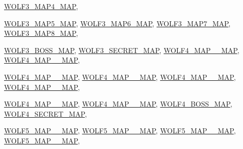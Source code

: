 \begin{DoxyCompactItemize}
\hyperlink{MAPSWL6_8H_a1949852ef0462081a2b248dd4918bb86a90ebcb09ab1567937fd158f38ebd1c60}{WOLF3\_\-MAP4\_\-MAP}, 
\par
\hyperlink{MAPSWL6_8H_a1949852ef0462081a2b248dd4918bb86a80a97ef076ec587cbfe05e7673778499}{WOLF3\_\-MAP5\_\-MAP}, 
\hyperlink{MAPSWL6_8H_a1949852ef0462081a2b248dd4918bb86a7103424829314ef6780f7b984b591d1a}{WOLF3\_\-MAP6\_\-MAP}, 
\hyperlink{MAPSWL6_8H_a1949852ef0462081a2b248dd4918bb86a9809951987be0669e3a1b05b26f031e4}{WOLF3\_\-MAP7\_\-MAP}, 
\hyperlink{MAPSWL6_8H_a1949852ef0462081a2b248dd4918bb86ae1a84a558d40b14ba6ab19e16dbc8ef8}{WOLF3\_\-MAP8\_\-MAP}, 
\par
\hyperlink{MAPSWL6_8H_a1949852ef0462081a2b248dd4918bb86aeabb6ea46b7a910028143794d53b4240}{WOLF3\_\-BOSS\_\-MAP}, 
\hyperlink{MAPSWL6_8H_a1949852ef0462081a2b248dd4918bb86aaa7c864b61599c6909e31b90510a6680}{WOLF3\_\-SECRET\_\-MAP}, 
\hyperlink{MAPSWL6_8H_a1949852ef0462081a2b248dd4918bb86a4248e70654c9947ab310806fe0a1f943}{WOLF4\_\-MAP\_\_\-MAP}, 
\hyperlink{MAPSWL6_8H_a1949852ef0462081a2b248dd4918bb86a1358ac46d5689a271c75d9b649a4785f}{WOLF4\_\-MAP\_\_\-MAP}, 
\par
\hyperlink{MAPSWL6_8H_a1949852ef0462081a2b248dd4918bb86a3cb0e5681a9dba24b011752cbfb33f8f}{WOLF4\_\-MAP\_\_\-MAP}, 
\hyperlink{MAPSWL6_8H_a1949852ef0462081a2b248dd4918bb86a5a9a74f7364a9d803604a559fe08449a}{WOLF4\_\-MAP\_\_\-MAP}, 
\hyperlink{MAPSWL6_8H_a1949852ef0462081a2b248dd4918bb86a18e7496fbb20816abe8b8efd04a91046}{WOLF4\_\-MAP\_\_\-MAP}, 
\hyperlink{MAPSWL6_8H_a1949852ef0462081a2b248dd4918bb86aef06e10fb37a099af836493794fe5834}{WOLF4\_\-MAP\_\_\-MAP}, 
\par
\hyperlink{MAPSWL6_8H_a1949852ef0462081a2b248dd4918bb86a945bf5eb73195fd37c27cd699595c7e3}{WOLF4\_\-MAP\_\_\-MAP}, 
\hyperlink{MAPSWL6_8H_a1949852ef0462081a2b248dd4918bb86a62f303c9afdf731f891ccef85bb03eb6}{WOLF4\_\-MAP\_\_\-MAP}, 
\hyperlink{MAPSWL6_8H_a1949852ef0462081a2b248dd4918bb86af39cb252392ce0ec4d6422097b626772}{WOLF4\_\-BOSS\_\-MAP}, 
\hyperlink{MAPSWL6_8H_a1949852ef0462081a2b248dd4918bb86a35ed6bfe5c295afdc524b442638ca657}{WOLF4\_\-SECRET\_\-MAP}, 
\par
\hyperlink{MAPSWL6_8H_a1949852ef0462081a2b248dd4918bb86ac656bc1d0c788c34c294ab022b700b81}{WOLF5\_\-MAP\_\_\-MAP}, 
\hyperlink{MAPSWL6_8H_a1949852ef0462081a2b248dd4918bb86aaf32aae05a3e98852d3dba0cc2ec7ddc}{WOLF5\_\-MAP\_\_\-MAP}, 
\hyperlink{MAPSWL6_8H_a1949852ef0462081a2b248dd4918bb86a427784b1c9cfadab1466a07e0ccf7804}{WOLF5\_\-MAP\_\_\-MAP}, 
\hyperlink{MAPSWL6_8H_a1949852ef0462081a2b248dd4918bb86a613877e983cfabcb19851fb1d25475c8}{WOLF5\_\-MAP\_\_\-MAP}, 

\end{DoxyCompactItemize}
